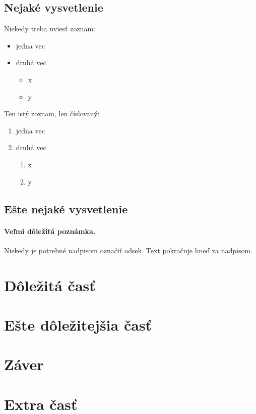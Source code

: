 \documentclass[8pt,,slovak,a4paper]{article}
\begin{document}
\subsection{Nejaké vysvetlenie} \label{ina:nejake}

Niekedy treba uviesť zoznam:

\begin{itemize}
\item jedna vec
\item druhá vec
	\begin{itemize}
	\item x
	\item y
	\end{itemize}
\end{itemize}

Ten istý zoznam, len číslovaný:

\begin{enumerate}
\item jedna vec
\item druhá vec
	\begin{enumerate}
	\item x
	\item y
	\end{enumerate}
\end{enumerate}


\subsection{Ešte nejaké vysvetlenie} \label{ina:este}

\paragraph{Veľmi dôležitá poznámka.}
Niekedy je potrebné nadpisom označiť odsek. Text pokračuje hneď za nadpisom.



\section{Dôležitá časť} \label{dolezita}




\section{Ešte dôležitejšia časť} \label{dolezitejsia}




\section{Záver} \label{zaver} %

\section{Extra časť}






\end{document}
